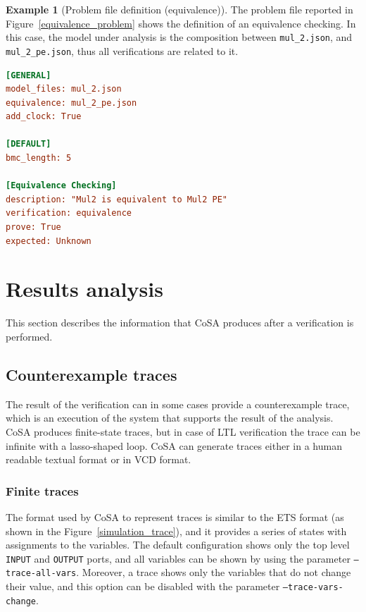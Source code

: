 \documentclass{article}
\theoremstyle{definition}
\newtheorem{example}{Example}[section]
\begin{document}
\begin{example}[Problem file definition (equivalence)]
The problem file reported in Figure~\ref{equivalence_problem} shows
the definition of an equivalence checking. In this case, the model
under analysis is the composition between \texttt{mul\_2.json}, and
\texttt{mul\_2\_pe.json}, thus all verifications are related to it.
  
\begin{lstlisting}[frame=single,language=Ini,caption=Problem file in \texttt{examples/mul\_2/problem\_1.txt},label=equivalence_problem]
[GENERAL]
model_files: mul_2.json
equivalence: mul_2_pe.json
add_clock: True

[DEFAULT]
bmc_length: 5

[Equivalence Checking]
description: "Mul2 is equivalent to Mul2 PE"
verification: equivalence
prove: True
expected: Unknown
\end{lstlisting}
\end{example}

\section{Results analysis}
\label{sec:results_analysis}

This section describes the information that CoSA produces after a
verification is performed.

\subsection{Counterexample traces}

The result of the verification can in some cases provide a
counterexample trace, which is an execution of the system that
supports the result of the analysis. CoSA produces finite-state
traces, but in case of LTL verification the trace can be infinite with
a lasso-shaped loop. CoSA can generate traces either in a human
readable textual format or in VCD format.

\subsubsection{Finite traces}

The format used by CoSA to represent traces is similar to the ETS
format (as shown in the Figure~\ref{simulation_trace}), and it
provides a series of states with assignments to the variables. The
default configuration shows only the top level \texttt{INPUT} and
\texttt{OUTPUT} ports, and all variables can be shown by using the
parameter \texttt{--trace-all-vars}. Moreover, a trace shows only the
variables that do not change their value, and this option can be
disabled with the parameter \texttt{--trace-vars-change}.
\end{document}
